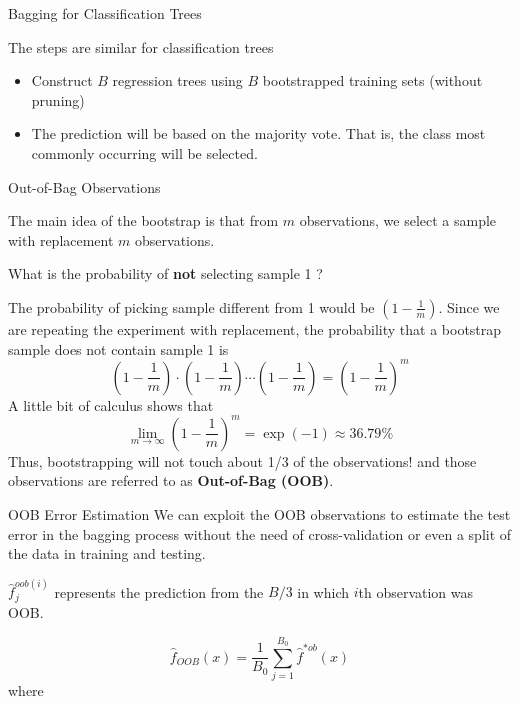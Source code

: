 \documentclass{beamer}
\begin{document}
\begin{frame}{Bagging for Classification Trees}
	
	The steps are similar for classification trees
	\begin{itemize}
		\item Construct $B$ regression trees using $B$ bootstrapped training sets (without pruning)
		\item The prediction will be based on the majority vote. That is, the class most commonly occurring will be selected.
	\end{itemize}

\end{frame}

\begin{frame}{Out-of-Bag Observations}
	
	The main idea of the bootstrap is that from $m$ observations, we select a sample with replacement $m$ observations.
	
	What is the probability of {\bf not} selecting sample 1 ?
	
	The probability of picking sample different from 1 would be 
	$(1 - \frac{1}{m})$. Since we are repeating the experiment with replacement, the probability that a bootstrap sample does not contain sample 1 is 
	\begin{equation*}
		\left(1 - \frac{1}{m}\right) \cdot \left(1 - \frac{1}{m}\right) \cdots \left(1 - \frac{1}{m}\right) = \left(1 - \frac{1}{m}\right)^m
	\end{equation*}
	 A little bit of calculus shows that 
	 \begin{equation*}
	 \lim_{m\to\infty}\left(1-\frac{1}{m}\right)^m= \exp(-1) \approx 36.79\%
	 \end{equation*}
Thus, bootstrapping will not touch about 1/3 of the observations!
and those observations are referred to as {\bf Out-of-Bag (OOB)}.  
\end{frame}

\begin{frame}{OOB Error Estimation}
	We can exploit the OOB observations to estimate the test error in the bagging process without the need of cross-validation or even a split of the data in training and testing.
	
	$\hat{f}_{j}^{oob(i)}$ represents the prediction from the $B/3$ in which $i$th observation was OOB.
	
	
	\begin{equation*}
		\hat{f}_{OOB}(x)= \frac{1}{B_0}\sum_{j=1}^{B_0} \hat{f}^{*ob}(x)
	\end{equation*}
where 
\end{frame}
\end{document}
